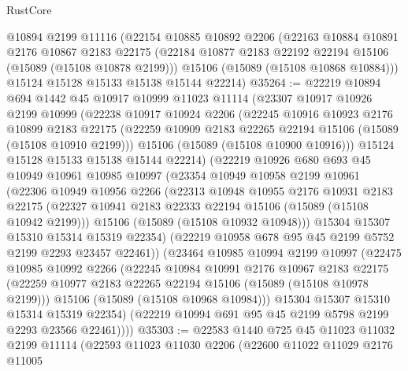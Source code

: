 \begin{lexlean}{RustCore}
\begin{coremodule}
    @10894
    @2199
    @11116
    (@22154
      @10885
      @10892
      @2206
      (@22163
        @10884
        @10891
        @2176
        @10867
        @2183
        @22175
        (@22184 @10877 @2183 @22192 @22194 @15106 (@15089 (@15108 @10878 @2199)))
        @15106
        (@15089 (@15108 @10868 @10884)))
      @15124
      @15128
      @15133
      @15138
      @15144
      @22214)
@35264 := @22219
    @10894
    @694
    @1442
    @45
    @10917
    @10999
    @11023
    @11114
    (@23307
      @10917
      @10926
      @2199
      @10999
      (@22238
        @10917
        @10924
        @2206
        (@22245
          @10916
          @10923
          @2176
          @10899
          @2183
          @22175
          (@22259 @10909 @2183 @22265 @22194 @15106 (@15089 (@15108 @10910 @2199)))
          @15106
          (@15089 (@15108 @10900 @10916)))
        @15124
        @15128
        @15133
        @15138
        @15144
        @22214)
      (@22219
        @10926
        @680
        @693
        @45
        @10949
        @10961
        @10985
        @10997
        (@23354
          @10949
          @10958
          @2199
          @10961
          (@22306
            @10949
            @10956
            @2266
            (@22313
              @10948
              @10955
              @2176
              @10931
              @2183
              @22175
              (@22327 @10941 @2183 @22333 @22194 @15106 (@15089 (@15108 @10942 @2199)))
              @15106
              (@15089 (@15108 @10932 @10948)))
            @15304
            @15307
            @15310
            @15314
            @15319
            @22354)
          (@22219 @10958 @678 @95 @45 @2199 @5752 @2199 @2293 @23457 @22461))
        (@23464
          @10985
          @10994
          @2199
          @10997
          (@22475
            @10985
            @10992
            @2266
            (@22245
              @10984
              @10991
              @2176
              @10967
              @2183
              @22175
              (@22259 @10977 @2183 @22265 @22194 @15106 (@15089 (@15108 @10978 @2199)))
              @15106
              (@15089 (@15108 @10968 @10984)))
            @15304
            @15307
            @15310
            @15314
            @15319
            @22354)
          (@22219 @10994 @691 @95 @45 @2199 @5798 @2199 @2293 @23566 @22461))))
@35303 := @22583
    @1440
    @725
    @45
    @11023
    @11032
    @2199
    @11114
    (@22593
      @11023
      @11030
      @2206
      (@22600
        @11022
        @11029
        @2176
        @11005

\end{coremodule}
\end{lexlean}
